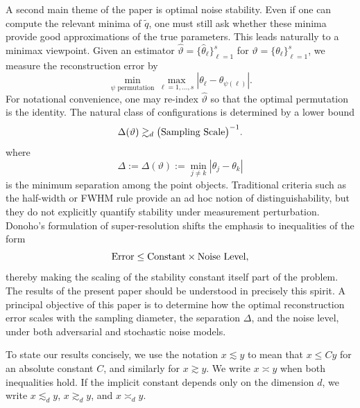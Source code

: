 \documentclass[11pt]{article}
\theoremstyle{definition}
\numberwithin{theorem}{section}
\numberwithin{lemma}{section}
\numberwithin{equation}{section}
\renewcommand{\hat}{\widehat}
\renewcommand{\tilde}{\widetilde}
\numberwithin{equation}{section}
\begin{document}
A second main theme of the paper is optimal noise stability. Even if one can compute the relevant minima of $\tilde q$, one must still ask whether these minima provide good approximations of the true parameters. This leads naturally to a minimax viewpoint. Given an estimator $\hat\vartheta=\{\hat\theta_\ell\}_{\ell=1}^s$ for $\vartheta=\{\theta_\ell\}_{\ell=1}^s$, we measure the reconstruction error by
\[
\min_{\psi \text{ permutation}}
\max_{\ell=1,\dots,s}
|\theta_\ell-\hat\theta_{\psi(\ell)}|.
\]
For notational convenience, one may re-index $\hat\vartheta$ so that the optimal permutation is the identity. The natural class of configurations is determined by a lower bound
\begin{equation}
\label{eq:separation}
\Delta(\vartheta)\gtrsim_d \big(\hbox{Sampling Scale}\big)^{-1}. 
\end{equation}
where 
\begin{equation}
\label{eq:minsep}
\Delta
:=\Delta(\vartheta)
:=\min_{j\neq k} |\theta_j-\theta_k|
\end{equation}
is the minimum separation among the point objects.
Traditional criteria such as the half-width or FWHM rule \cite{born_wolf_1999} provide an ad hoc notion of distinguishability, but they do not explicitly quantify stability under measurement perturbation. Donoho's formulation of super-resolution \cite{donoho1992superresolution} shifts the emphasis to inequalities of the form
\[
\hbox{Error} \le \hbox{Constant}\times \hbox{Noise Level},
\]
thereby making the scaling of the stability constant itself part of the problem. The results of the present paper should be understood in precisely this spirit. 
A principal objective of this paper is to determine how the optimal reconstruction error scales with the sampling diameter, the separation $\Delta$, and the noise level, under both adversarial and stochastic noise models.

To state our results concisely, we use the notation $x\lesssim y$ to mean that $x\le Cy$ for an absolute constant $C$, and similarly for $x\gtrsim y$. We write $x\asymp y$ when both inequalities hold. If the implicit constant depends only on the dimension $d$, we write $x\lesssim_d y$, $x\gtrsim_d y$, and $x\asymp_d y$.
\end{document}
